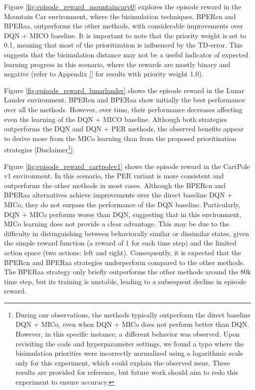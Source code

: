 Figure \ref{fig:episode_reward_mountaincarv0} explores the episode reward in the Mountain Car environment, where the bisimulation techniques, BPERcn and BPERaa, outperforms the other methods, with considerable improvements over DQN + MICO baseline. It is important to note that the priority weight is set to 0.1, meaning that most of the prioritization is influenced by the TD-error. This suggests that the bisimulation distance may not be a useful indicator of expected learning progress in this scenario, where the rewards are mostly binary and negative (refer to Appendix \ref{} for results with priority weight 1.0).

Figure \ref{fig:episode_reward_lunarlander} shows the episode reward in the Lunar Lander environment. BPERcn and BPERaa show initially the best performance over all the methods. However, over time, their performance decreases affecting even the learning of the DQN + MICO baseline. Although both strategies outperforms the DQN and DQN + PER methods, the observed benefits appear to derive more from the MICo learning than from the proposed prioritization strategies [Disclaimer\footnote{During our observations, the methods typically outperform the direct baseline DQN + MICo, even when DQN + MICo does not perform better than DQN. However, in this specific instance, a different behavior was observed. Upon revisiting the code and hyperparameter settings, we found a typo where the bisimulation priorities were incorrectly normalized using a logarithmic scale only for this experiment, which could explain the observed issue. These results are provided for reference, but future work should aim to redo this experiment to ensure accuracy.}].

Figure \ref{fig:episode_reward_cartpolev1} shows the episode reward in the CartPole v1 environment. In this scenario, the PER variant is more consistent and outperforms the other methods in most cases. Although the BPERcn and BPERaa alternatives achieve improvements over the direct baseline DQN + MICo, they do not surpass the performance of the DQN baseline. Particularly, DQN + MICo performs worse than DQN, suggesting that in this environment, MICo learning does not provide a clear advantage. This may be due to the difficulty in distinguishing between behaviorally similar or dissimilar states, given the simple reward function (a reward of 1 for each time step) and the limited action space (two actions: left and right). Consequently, it is expected that the BPERcn and BPERaa strategies underperform compared to the other methods. The BPERaa strategy only briefly outperforms the other methods around the 80k time step, but its training is unstable, leading to a subsequent decline in episode reward.


